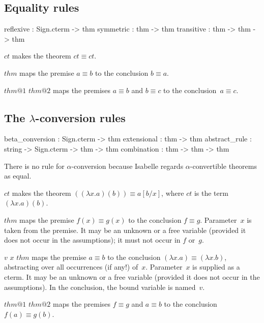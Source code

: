 \subsection{Equality rules}
\begin{ttbox} 
reflexive  : Sign.cterm -> thm
symmetric  : thm -> thm
transitive : thm -> thm -> thm
\end{ttbox}
\begin{ttdescription}
\item[\ttindexbold{reflexive} $ct$] 
makes the theorem \(ct\equiv ct\). 

\item[\ttindexbold{symmetric} $thm$] 
maps the premise $a\equiv b$ to the conclusion $b\equiv a$.

\item[\ttindexbold{transitive} $thm@1$ $thm@2$] 
maps the premises $a\equiv b$ and $b\equiv c$ to the conclusion~${a\equiv c}$.
\end{ttdescription}


\subsection{The $\lambda$-conversion rules}
\begin{ttbox} 
beta_conversion : Sign.cterm -> thm
extensional     : thm -> thm
abstract_rule   : string -> Sign.cterm -> thm -> thm
combination     : thm -> thm -> thm
\end{ttbox} 
There is no rule for $\alpha$-conversion because Isabelle regards
$\alpha$-convertible theorems as equal.
\begin{ttdescription}
\item[\ttindexbold{beta_conversion} $ct$] 
makes the theorem $((\lambda x.a)(b)) \equiv a[b/x]$, where $ct$ is the
term $(\lambda x.a)(b)$.

\item[\ttindexbold{extensional} $thm$] 
maps the premise $f(x) \equiv g(x)$ to the conclusion $f\equiv g$.
Parameter~$x$ is taken from the premise.  It may be an unknown or a free
variable (provided it does not occur in the assumptions); it must not occur
in $f$ or~$g$.

\item[\ttindexbold{abstract_rule} $v$ $x$ $thm$] 
maps the premise $a\equiv b$ to the conclusion $(\lambda x.a) \equiv
(\lambda x.b)$, abstracting over all occurrences (if any!) of~$x$.
Parameter~$x$ is supplied as a cterm.  It may be an unknown or a free
variable (provided it does not occur in the assumptions).  In the
conclusion, the bound variable is named~$v$.

\item[\ttindexbold{combination} $thm@1$ $thm@2$] 
maps the premises $f\equiv g$ and $a\equiv b$ to the conclusion~$f(a)\equiv
g(b)$.
\end{ttdescription}



